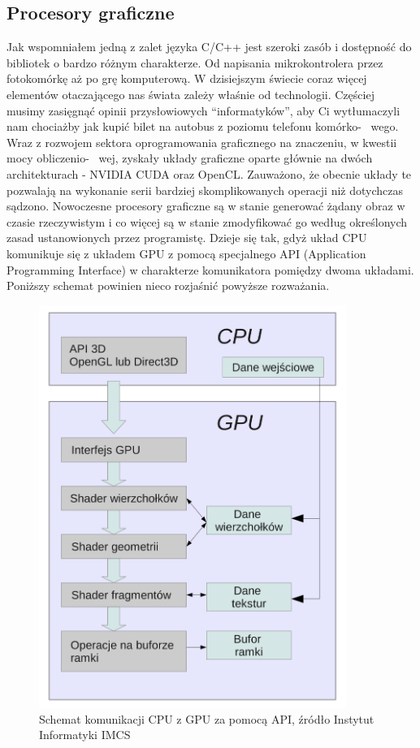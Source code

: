 \documentclass{article}
\begin{document}
	\subsection{Procesory graficzne}
	Jak wspomniałem jedną z zalet języka C/C++ jest szeroki zasób i dostępność do bibliotek o bardzo różnym charakterze. Od napisania mikrokontrolera przez fotokomórkę aż po grę komputerową. W dzisiejszym świecie coraz więcej elementów otaczającego nas świata zależy właśnie od technologii. Częściej musimy zasięgnąć opinii przysłowiowych “informatyków”, aby Ci wytłumaczyli nam chociażby jak kupić bilet na autobus z poziomu telefonu komórko- \ wego. Wraz z rozwojem sektora oprogramowania graficznego na znaczeniu, w kwestii mocy obliczenio- \ wej, zyskały układy graficzne oparte głównie na dwóch architekturach - NVIDIA CUDA oraz OpenCL. Zauważono, że obecnie układy te pozwalają na wykonanie serii bardziej skomplikowanych operacji niż dotychczas sądzono. Nowoczesne procesory graficzne są w stanie generować żądany obraz w czasie rzeczywistym i co więcej są w stanie zmodyfikować go według określonych zasad ustanowionych przez programistę. Dzieje się tak, gdyż układ CPU komunikuje się z układem GPU z pomocą specjalnego API (Application Programming Interface) w charakterze komunikatora pomiędzy dwoma układami. Poniższy schemat powinien nieco rozjaśnić powyższe rozważania.
	\begin{figure}
		\centering
		\includegraphics[width=10cm]{gpu}
		\caption{Schemat komunikacji CPU z GPU za pomocą API, źródło Instytut Informatyki IMCS}
	\end{figure}
\end{document}
